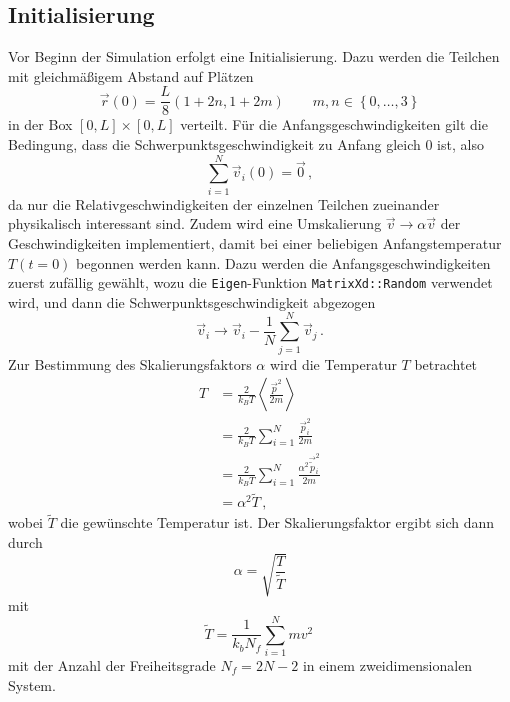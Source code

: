 \subsection*{Initialisierung}
Vor Beginn der Simulation erfolgt eine Initialisierung. Dazu werden die Teilchen mit gleichmäßigem Abstand auf Plätzen
\begin{equation*}
    \vec{r} \left(0\right) = \frac{L}{8} \left(1 + 2 n, 1 + 2 m\right) \qquad m, n \in \left\{0, \dots, 3\right\}
\end{equation*}
in der Box $\left[0, L\right] \times \left[0, L\right]$ verteilt.
Für die Anfangsgeschwindigkeiten gilt die Bedingung, dass die Schwerpunktsgeschwindigkeit zu Anfang gleich 0 ist,
also
\begin{equation*}
    \sum_{i = 1}^{N} \vec{v}_i \left(0\right) = \vec{0} \, ,
\end{equation*}
da nur die Relativgeschwindigkeiten der einzelnen Teilchen zueinander physikalisch interessant sind.
Zudem wird eine Umskalierung $\vec{v} \rightarrow \alpha \vec{v}$ der Geschwindigkeiten implementiert, damit bei einer
beliebigen Anfangstemperatur $T \left(t = 0\right)$ begonnen werden kann. 
Dazu werden die Anfangsgeschwindigkeiten zuerst zufällig gewählt, wozu
die \texttt{Eigen}-Funktion \texttt{MatrixXd::Random} verwendet wird, und dann die Schwerpunktsgeschwindigkeit abgezogen
\begin{equation*}
    \vec{v}_i \rightarrow \vec{v}_i - \frac{1}{N} \sum_{j = 1}^{N} \vec{v}_j \, .
\end{equation*}
Zur Bestimmung des Skalierungsfaktors $\alpha$ wird die Temperatur $T$ betrachtet 
\begin{align*}
    T &= \frac{2}{k_B T} \left\langle \frac{\vec{p}^2}{2 m}\right\rangle \\
      &= \frac{2}{k_B T} \sum_{i = 1}^{N} \frac{\vec{p}_i^2}{2 m} \\
      &= \frac{2}{k_B T} \sum_{i = 1}^{N} \frac{\alpha^2 \vec{\tilde{p}}_i^2}{2 m} \\
      &= \alpha^2 \tilde{T} \, ,
\end{align*}
wobei $\tilde{T}$ die gewünschte Temperatur ist.
Der Skalierungsfaktor ergibt sich dann durch
\begin{equation*}
    \alpha = \sqrt{\frac{T}{\tilde{T}}}
\end{equation*}
mit 
\begin{equation*}
    \tilde{T} = \frac{1}{k_b N_f} \sum_{i = 1}^{N} m v^2 \,
\end{equation*}
mit der Anzahl der Freiheitsgrade $N_f = 2N - 2$ in einem zweidimensionalen System.


